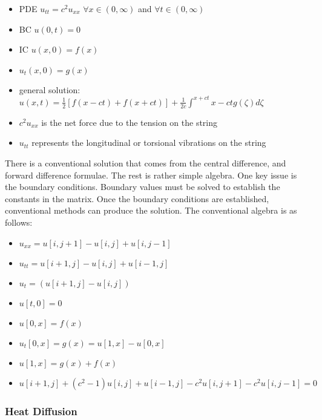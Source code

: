 \begin{itemize}
\item PDE $u_{tt} = c^2 u_{xx}$  $\forall x \in (0, \infty)$ and $\forall t \in (0,\infty)$ 
\item BC $u(0,t) = 0$
\item IC $u(x,0)= f(x)$
\item $u_t (x,0) = g(x)$
\item general solution: $ u(x,t) = \frac{1}{2} [ f(x-ct) + f(x+ct)] + \frac{1}{2c} \int ^{x+ct}{x-ct} g(\zeta) d\zeta$
\item $c^2 u_{xx} $ is the net force due to the tension on the string
\item $u_{tt}$  represents the longitudinal or torsional vibrations on the string
\end{itemize}

There is a conventional solution that comes from the central difference, and forward difference formulae.  The rest is rather simple algebra.  One key issue is the boundary conditions.  Boundary values must %
be solved to establish the constants in the matrix.  Once the boundary conditions %
are established, %
conventional methods can produce the solution.   The conventional algebra is as follows:

\begin{itemize}
\item $u_{xx} = u[i,j+1] - u[i,j] + u[i,j-1] $
\item $u_{tt} = u[i+1,j] - u[i,j] + u[i-1,j] $
\item $u_t = (u[i+1,j] - u[i,j]) $
\item $u[t,0] = 0 $
\item $u[0,x] = f(x) $
\item $u_t [0,x] = g(x) = u [1, x] - u[0,x] $
\item $u[1,x] = g(x) + f(x) $
\item $ u[i+1,j] + (c^2 - 1)u[i,j] + u[i-1,j] - c^2u[i,j+1]  - c^2 u[i,j-1] = 0 $
\end{itemize}



\subsubsection {Heat Diffusion}

